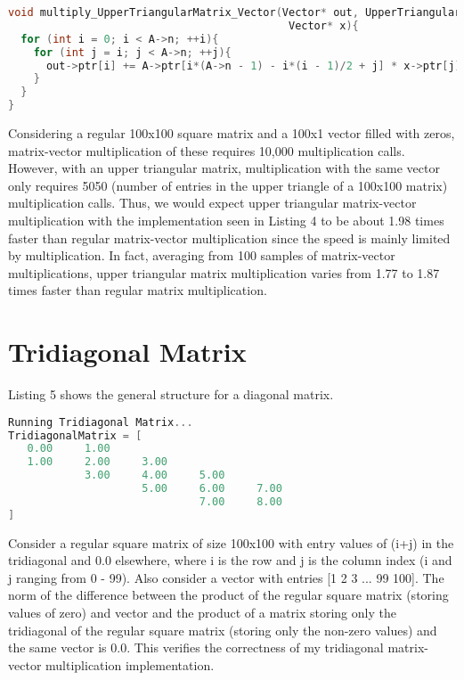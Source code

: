 \documentclass{article}
\begin{document}
\begin{lstlisting}[language=C, basicstyle=\ttfamily, caption={Upper Triangular Matrix-Vector Multiplication Implementation.}]
void multiply_UpperTriangularMatrix_Vector(Vector* out, UpperTriangularMatrix* A, 
                                            Vector* x){
  for (int i = 0; i < A->n; ++i){
    for (int j = i; j < A->n; ++j){
      out->ptr[i] += A->ptr[i*(A->n - 1) - i*(i - 1)/2 + j] * x->ptr[j];
    }
  }
}
\end{lstlisting}

Considering a regular 100x100 square matrix and a 100x1 vector filled with zeros, matrix-vector multiplication of these requires 10,000 multiplication calls. However, with an upper triangular matrix, multiplication with the same vector only requires 5050 (number of entries in the upper triangle of a 100x100 matrix) multiplication calls. Thus, we would expect upper triangular matrix-vector multiplication with the implementation seen in Listing 4 to be about 1.98 times faster than regular matrix-vector multiplication since the speed is mainly limited by multiplication. In fact, averaging from 100 samples of matrix-vector multiplications, upper triangular matrix multiplication varies from 1.77 to 1.87 times faster than regular matrix multiplication.

\section{Tridiagonal Matrix}

Listing 5 shows the general structure for a diagonal matrix.

\begin{lstlisting}[language=C, basicstyle=\ttfamily, caption={Tridiagonal Matrix Output.}]
Running Tridiagonal Matrix...
TridiagonalMatrix = [
   0.00     1.00                             
   1.00     2.00     3.00                    
            3.00     4.00     5.00           
                     5.00     6.00     7.00  
                              7.00     8.00  
]
\end{lstlisting}

Consider a regular square matrix of size 100x100 with entry values of (i+j) in the tridiagonal and 0.0 elsewhere, where i is the row and j is the column index (i and j ranging from 0 - 99). Also consider a vector with entries [1 2 3 ... 99 100]. The norm of the difference between the product of the regular square matrix (storing values of zero) and vector and the product of a matrix storing only the tridiagonal of the regular square matrix (storing only the non-zero values) and the same vector is 0.0. This verifies the correctness of my tridiagonal matrix-vector multiplication implementation.
\end{document}
